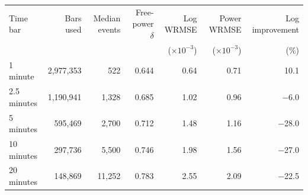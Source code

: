 \begin{tabular}{lrrrrrr}
\toprule
Time bar & Bars used & Median events & Free-power $\delta$ & Log WRMSE & Power WRMSE & Log improvement \\
 & & & & ($\times 10^{-3}$) & ($\times 10^{-3}$) & (\%) \\
\midrule
1 minute & 2,977,353 & 522 & 0.644 & 0.64 & 0.71 & 10.1 \\
2.5 minutes & 1,190,941 & 1,328 & 0.685 & 1.02 & 0.96 & $-$6.0 \\
5 minutes & 595,469 & 2,700 & 0.712 & 1.48 & 1.16 & $-$28.0 \\
10 minutes & 297,736 & 5,500 & 0.746 & 1.98 & 1.56 & $-$27.0 \\
20 minutes & 148,869 & 11,252 & 0.783 & 2.55 & 2.09 & $-$22.5 \\
\bottomrule
\end{tabular}
